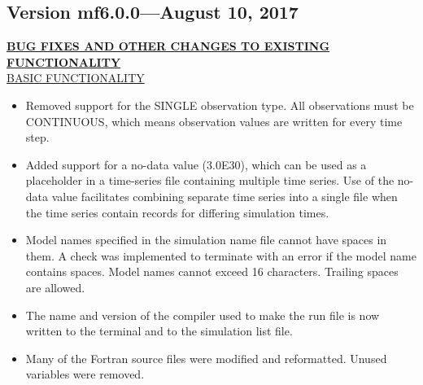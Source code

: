 	\subsection{Version mf6.0.0---August 10, 2017}
	
	\textbf{\underline{BUG FIXES AND OTHER CHANGES TO EXISTING FUNCTIONALITY}} \\
	\underline{BASIC FUNCTIONALITY}
	\begin{itemize}
		\item Removed support for the SINGLE observation type.  All observations must be CONTINUOUS, which means observation values are written for every time step. 
		\item Added support for a no-data value (3.0E30), which can be used as a placeholder in a time-series file containing multiple time series. Use of the no-data value facilitates combining separate time series into a single file when the time series contain records for differing simulation times.
		\item Model names specified in the simulation name file cannot have spaces in them.  A check was implemented to terminate with an error if the model name contains spaces.  Model names cannot exceed 16 characters.  Trailing spaces are allowed.
		\item The name and version of the compiler used to make the run file is now written to the terminal and to the simulation list file.
		\item Many of the Fortran source files were modified and reformatted.  Unused variables were removed.
	\end{itemize}
	
